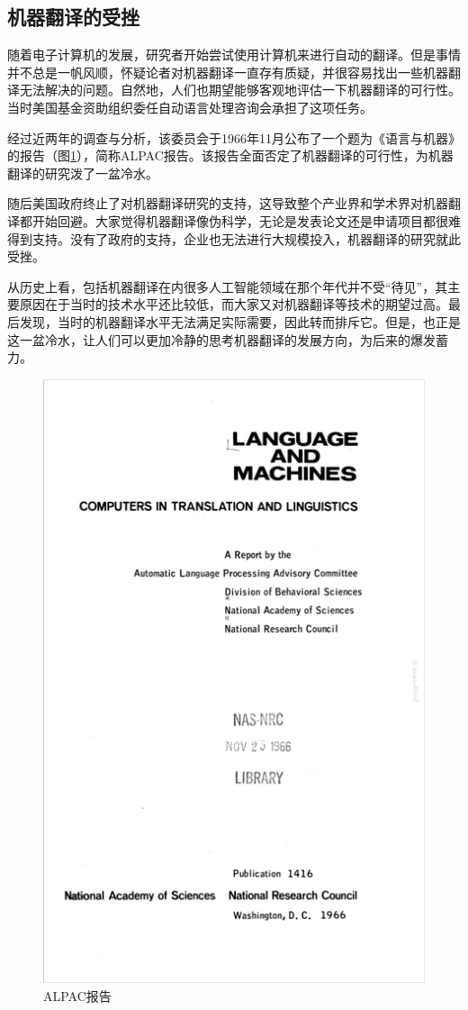 \subsection{机器翻译的受挫}

\parinterval 随着电子计算机的发展，研究者开始尝试使用计算机来进行自动的翻译。但是事情并不总是一帆风顺，怀疑论者对机器翻译一直存有质疑，并很容易找出一些机器翻译无法解决的问题。自然地，人们也期望能够客观地评估一下机器翻译的可行性。当时美国基金资助组织委任自动语言处理咨询会承担了这项任务。

\parinterval 经过近两年的调查与分析，该委员会于1966年11月公布了一个题为《语言与机器》的报告（图\ref{fig:1-5}），简称ALPAC报告。该报告全面否定了机器翻译的可行性，为机器翻译的研究泼了一盆冷水。

\parinterval 随后美国政府终止了对机器翻译研究的支持，这导致整个产业界和学术界对机器翻译都开始回避。大家觉得机器翻译像伪科学，无论是发表论文还是申请项目都很难得到支持。没有了政府的支持，企业也无法进行大规模投入，机器翻译的研究就此受挫。

\parinterval 从历史上看，包括机器翻译在内很多人工智能领域在那个年代并不受``待见''，其主要原因在于当时的技术水平还比较低，而大家又对机器翻译等技术的期望过高。最后发现，当时的机器翻译水平无法满足实际需要，因此转而排斥它。但是，也正是这一盆冷水，让人们可以更加冷静的思考机器翻译的发展方向，为后来的爆发蓄力。

\begin{figure}[htp]
    \centering
\includegraphics[scale=0.65]{./Chapter1/Figures/figure-report.jpg}
    \caption{ALPAC报告}
    \label{fig:1-5}
\end{figure}

